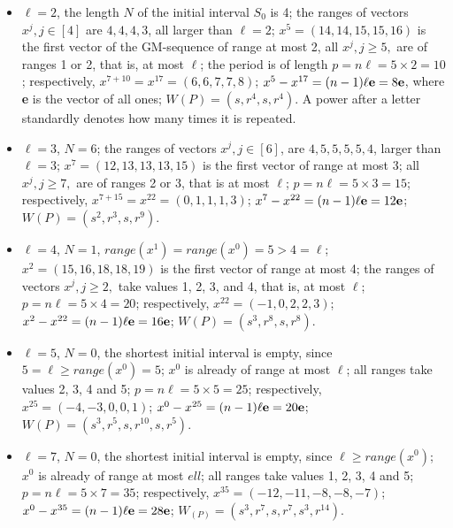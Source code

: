 \documentclass[10pt]{article}
\theoremstyle{definition}
\begin{document}
\begin{itemize} 
\item
$\ell = 2$, 
the length  $N$  of the initial interval $S_0$ is 4;
the ranges of vectors $x^j, j \in [4]$  are 
$4, 4, 4, 3$, all larger than $\ell = 2$; 
$x^5 = (14, 14, 15, 15, 16)$  
is the first vector of the GM-sequence of range at most 2,  
all  $x^j, j \geq 5,$  are of ranges 1 or 2, 
that is, at most $\ell$;  
the period is of length  $p = n \ell =  5 \times 2  = 10$; 
respectively, $x^{7+10} = x^{17} = (6, 6, 7, 7, 8)$; 
$x^5 - x^{17} = (n-1) \ell {\bf e} = 8 {\bf e}$, 
where {\bf e}  is the vector of all ones;    
$W(P) = (s, r^4, s, r^4)$.
A power after a letter standardly denotes 
how many times it is repeated.

\item
$\ell = 3$, $N = 6$;  
the ranges of vectors $x^j, j \in [6]$,  are 
$4, 5, 5, 5, 5, 4$,  larger than $\ell = 3$; \;  
$x^7 = (12, 13, 13, 13, 15)$  is the first vector of range at most 3;  
all  $x^j, j \geq 7,$  are of ranges 2 or 3, that is at most $\ell$; \;   
$p = n \ell = 5 \times 3  = 15$; 
respectively, $x^{7+15} = x^{22} = (0, 1, 1, 1, 3)$; \;  
$x^7 - x^{22} = (n-1) \ell {\bf e} = 12 {\bf e}$; \; 
$W(P) = (s^2, r^3, s, r^9)$.  

\item
$\ell = 4$, $N = 1$, 
$range(x^1) = range(x^0) = 5 > 4 = \ell$; \;  
$x^2 = (15, 16, 18, 18, 19)$ is the first vector of range at most 4;  
the ranges of vectors  $x^j, j \geq 2,$  
take values 1, 2, 3, and 4, that is, at most $\ell$; \;   
$p = n \ell = 5 \times 4  = 20$; 
respectively,  $x^{22} = (-1, 0, 2, 2, 3)$; \; 
$x^2 - x^{22} = (n-1) \ell {\bf e} = 16 {\bf e}$; \; 
$W(P) = (s^3, r^8, s, r^8)$.   

\item
$\ell = 5$, $N = 0$, 
the shortest initial interval is empty, since 
$5 = \ell \geq range(x^0) = 5$;  
$x^0$ is already of range at most $\ell$; \;     
all ranges take values 2, 3, 4 and 5; \;   
$p = n \ell = 5 \times 5  = 25$; 
respectively, $x^{25} = (-4, -3, 0, 0, 1)$; \;  
$x^0 - x^{25} = (n-1) \ell {\bf e} = 20 {\bf e}$; \; 
$W(P) = (s^3, r^5, s, r^{10}, s, r^5)$. 

\item
$\ell = 7$,  $N = 0$, 
the shortest initial interval is empty, since 
$\ell \geq range(x^0)$; \;  $x^0$ is already of range at most $ell$; \;     
all ranges take values 1, 2, 3, 4 and 5; \;   
$p = n \ell = 5 \times 7  = 35$; 
respectively, $x^{35} = (-12, -11, -8, -8, -7)$; \;  
$x^0 - x^{35} = (n-1) \ell {\bf e} = 28 {\bf e}$; \; 
$W_(P) = (s^3, r^7, s, r^7, s^3, r^{14})$.  
\end{itemize} 
\end{document}
